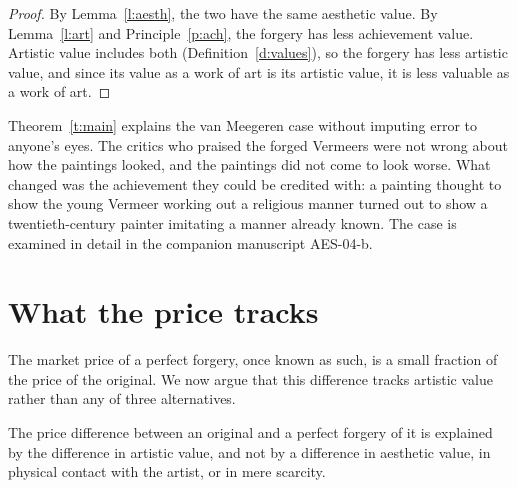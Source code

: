 \documentclass{situationist-preprint}
\begin{document}
\begin{proof}
By Lemma~\ref{l:aesth}, the two have the same aesthetic value. By Lemma~\ref{l:art} and Principle~\ref{p:ach}, the forgery has less achievement value. Artistic value includes both (Definition~\ref{d:values}), so the forgery has less artistic value, and since its value as a work of art is its artistic value, it is less valuable as a work of art.
\end{proof}

Theorem~\ref{t:main} explains the van Meegeren case without imputing error to anyone's eyes. The critics who praised the forged Vermeers were not wrong about how the paintings looked, and the paintings did not come to look worse. What changed was the achievement they could be credited with: a painting thought to show the young Vermeer working out a religious manner turned out to show a twentieth-century painter imitating a manner already known. The case is examined in detail in the companion manuscript AES-04-b.

\section{What the price tracks}

The market price of a perfect forgery, once known as such, is a small fraction of the price of the original. We now argue that this difference tracks artistic value rather than any of three alternatives.

\begin{proposition}\label{p:price}
The price difference between an original and a perfect forgery of it is explained by the difference in artistic value, and not by a difference in aesthetic value, in physical contact with the artist, or in mere scarcity.
\end{proposition}
\end{document}
